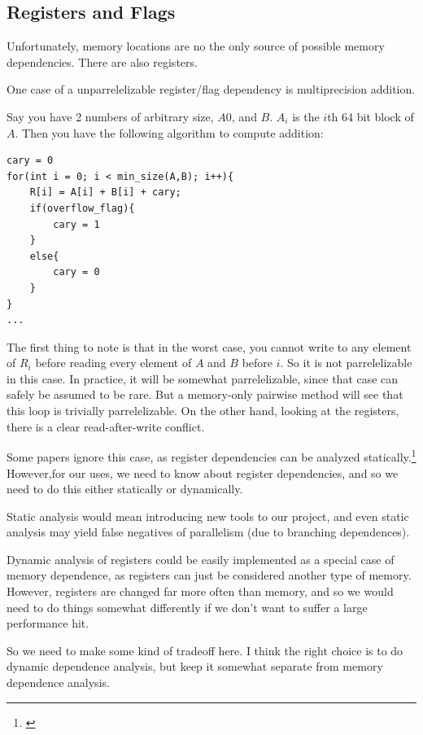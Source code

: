 \documentclass[12pt,twoside]{reedthesis}
\begin{document}
		
		
		\subsection{Registers and Flags}
		Unfortunately, memory locations are no the only source of possible memory dependencies. There are also registers.
		
		
		One case of a unparrelelizable register/flag dependency is multiprecision addition.
		
		Say you have 2 numbers of arbitrary size, $A0$, and $B$. $A_i$ is the $i$th 64 bit block of $A$. Then you have the following algorithm to compute addition:
		
		\begin{lstlisting}
cary = 0
for(int i = 0; i < min_size(A,B); i++){
	R[i] = A[i] + B[i] + cary;
	if(overflow_flag){
		cary = 1
	}
	else{
		cary = 0
	}
}
...
		\end{lstlisting}
		
		The first thing to note is that in the worst case, you cannot write to any element of $R_i$ before reading every element of $A$ and $B$ before $i$. So it is not parrelelizable in this case. In practice, it will be somewhat parrelelizable, since that case can safely be assumed to be rare. But a memory-only pairwise method will see that this loop is trivially parrelelizable. On the other hand, looking at the registers, there is a clear read-after-write conflict. 
		
		Some papers ignore this case, as register dependencies can be analyzed statically.\footnote{\cite{Chen:2004}} However,for our uses, we need to know about register dependencies, and so we need to do this either statically or dynamically. 
		
		Static analysis would mean introducing new tools to our project, and even static analysis may yield false negatives of parallelism (due to branching dependences). 
		
		Dynamic analysis of registers could be easily implemented as a special case of memory dependence, as registers can just be considered another type of memory. However, registers are changed far more often than memory, and so we would need to do things somewhat differently if we don't want to suffer a large performance hit. 
		
		So we need to make some kind of tradeoff here. I think the right choice is to do dynamic dependence analysis, but keep it somewhat separate from memory dependence analysis. 
		
\end{document}
